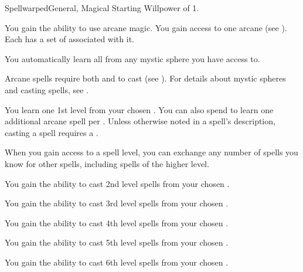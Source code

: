     \begin{feat}{Spellwarped}{General, Magical}
        \featpre Starting Willpower of 1.

         You gain the ability to use arcane magic.
        You gain access to one arcane  (see ).
        Each  has a set of  associated with it.

        You automatically learn all  from any mystic sphere you have access to.

        Arcane spells require both  and  to cast (see ).
        For details about mystic spheres and casting spells, see .

         You learn one 1st level  from your chosen .
        You can also spend  to learn one additional arcane spell per .
        Unless otherwise noted in a spell's description, casting a spell requires a .

        When you gain access to a spell level,
            you can exchange any number of spells you know for other spells,
            including spells of the higher level.

         You gain the ability to cast 2nd level spells from your chosen .

         You gain the ability to cast 3rd level spells from your chosen .

         You gain the ability to cast 4th level spells from your chosen .

         You gain the ability to cast 5th level spells from your chosen .

         You gain the ability to cast 6th level spells from your chosen .
    \end{feat}

